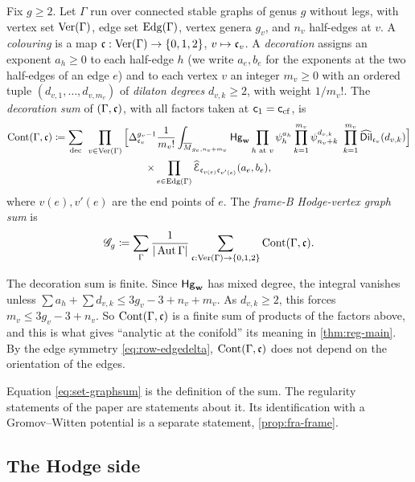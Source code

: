 \begin{defn}
\label{def:set-graphsum}
Fix $g\geq2$. Let $\Gamma$ run over connected stable graphs of genus $g$ without legs, with vertex set $\mathrm{Ver}(\Gamma)$, edge set $\mathrm{Edg}(\Gamma)$, vertex genera $g_v$, and $n_v$ half-edges at $v$. A \emph{colouring} is a map $\mathfrak{c}:\mathrm{Ver}(\Gamma)\to\{0,1,2\}$, $v\mapsto\mathfrak{c}_v$. A \emph{decoration} assigns an exponent $a_h\geq0$ to each half-edge $h$ (we write $a_e,b_e$ for the exponents at the two half-edges of an edge $e$) and to each vertex $v$ an integer $m_v\geq0$ with an ordered tuple $(d_{v,1},\ldots,d_{v,m_v})$ of \emph{dilaton degrees} $d_{v,k}\geq2$, with weight $1/m_v!$. The \emph{decoration sum} of $(\Gamma,\mathfrak{c})$, with all factors taken at $\mathsf{c}_{1}=\mathsf{c}_{\mathrm{cf}}$, is
\begin{multline}
\label{eq:set-graphsum}
\GCont(\Gamma,\col)\coloneqq\sum_{\mathrm{dec}}\ \prod_{v\in\Ver(\Gamma)}\Big[\Delta_{\col_v}^{g_v-1}\frac{1}{m_v!}\int_{\Mbar_{g_v,n_v+m_v}}\Hg_{\bw}\prod_{h\text{ at }v}\psi_h^{a_h}\prod_{k=1}^{m_v}\psi_{n_v+k}^{d_{v,k}}\ \prod_{k=1}^{m_v}\Dilh_{\col_v}(d_{v,k})\Big]\\
\times\prod_{e\in\Edg(\Gamma)}\Edgeh_{\col_{v(e)}\col_{v'(e)}}(a_e,b_e),
\end{multline}
where $v(e),v'(e)$ are the end points of $e$. The \emph{frame-B Hodge-vertex graph sum} is
\begin{equation}
\label{eq:set-Gsum}
\mathscr{G}_g\coloneqq\sum_{\Gamma}\frac{1}{|\operatorname{Aut}\Gamma|}\sum_{\mathfrak{c}:\mathrm{Ver}(\Gamma)\to\{0,1,2\}}\mathrm{Cont}(\Gamma,\mathfrak{c}).
\end{equation}
\end{defn}

The decoration sum is finite. Since $\mathsf{Hg}_{\mathbf{w}}$ has mixed degree, the integral vanishes unless $\sum a_h+\sum d_{v,k}\leq3g_v-3+n_v+m_v$. As $d_{v,k}\geq2$, this forces $m_v\leq3g_v-3+n_v$. So $\mathrm{Cont}(\Gamma,\mathfrak{c})$ is a finite sum of products of the factors above, and this is what gives ``analytic at the conifold'' its meaning in \cref{thm:reg-main}. By the edge symmetry \eqref{eq:row-edgedelta}, $\mathrm{Cont}(\Gamma,\mathfrak{c})$ does not depend on the orientation of the edges.

Equation \eqref{eq:set-graphsum} is the definition of the sum. The regularity statements of the paper are statements about it. Its identification with a Gromov--Witten potential is a separate statement, \cref{prop:fra-frame}.

\subsection{The Hodge side}
\label{sec:set-hodge}

